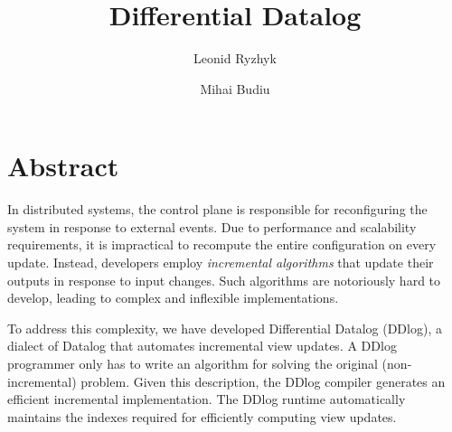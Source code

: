 \documentclass{svproc}
\author{
        Leonid Ryzhyk \and
        Mihai Budiu}
\institute{VMware Research}
\title{Differential Datalog}
\date{}
\begin{document}
\maketitle

\section{Abstract}

In distributed systems, the control plane is responsible for
reconfiguring the system in response to external events.  Due to
performance and scalability requirements, it is impractical to
recompute the entire configuration on every update.  Instead,
developers employ \emph{incremental algorithms} that update their
outputs in response to input changes.  Such algorithms are notoriously
hard to develop, leading to complex and inflexible implementations.

To address this complexity, we have developed Differential Datalog
(DDlog), a dialect of Datalog that automates incremental view updates.
A DDlog programmer only has to write an algorithm for solving the
original (non-incremental) problem.  Given this description, the DDlog
compiler generates an efficient incremental implementation.  The DDlog
runtime automatically maintains the indexes required for efficiently
computing view updates.









\end{document}
